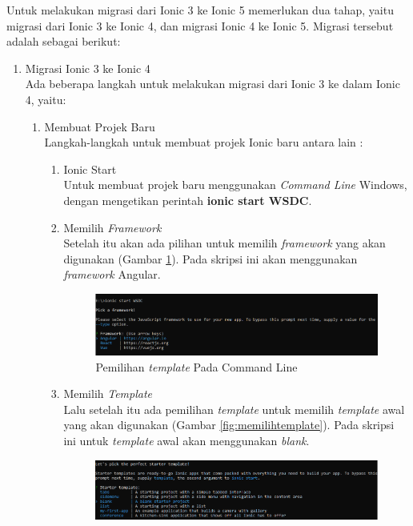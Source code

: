 Untuk melakukan migrasi dari Ionic 3 ke Ionic 5 memerlukan dua tahap, yaitu migrasi dari Ionic 3 ke Ionic 4, dan migrasi Ionic 4 ke Ionic 5. Migrasi tersebut adalah sebagai berikut:

\begin{enumerate}
	\item Migrasi Ionic 3 ke Ionic 4 \\
	Ada beberapa langkah untuk melakukan migrasi dari Ionic 3 ke dalam Ionic 4, yaitu:
	
	\begin{enumerate}
		\item Membuat Projek Baru \\
		Langkah-langkah untuk membuat projek Ionic baru antara lain :
		\begin{enumerate}
			\item Ionic Start \\
			Untuk membuat projek baru menggunakan {\it Command Line} Windows, dengan mengetikan perintah \textbf{ionic start WSDC}.
			\item Memilih {\it Framework} \\
			Setelah itu akan ada pilihan untuk memilih {\it framework} yang akan digunakan (Gambar \ref{fig:memilihframework}). Pada skripsi ini akan menggunakan {\it framework} Angular.
			\begin{figure}[H]
			    \centering
			    \includegraphics[scale=0.6]{Gambar/ssmemilhframework.png}
			    \caption{Pemilihan {\it template} Pada Command Line}
			    \label{fig:memilihframework}
			\end{figure}			
			\newpage
			\item Memilih {\it Template} \\
			Lalu setelah itu ada pemilihan {\it template} untuk memilih {\it template} awal yang akan digunakan (Gambar \ref{fig:memilihtemplate}). Pada skripsi ini untuk {\it template} awal akan menggunakan {\it blank}.
			\begin{figure}[H]
			    \centering
			    \includegraphics[scale=0.6]{Gambar/ssmemilihtemplate.png}

\end{figure}
\end{enumerate}
\end{enumerate}
\end{enumerate}

